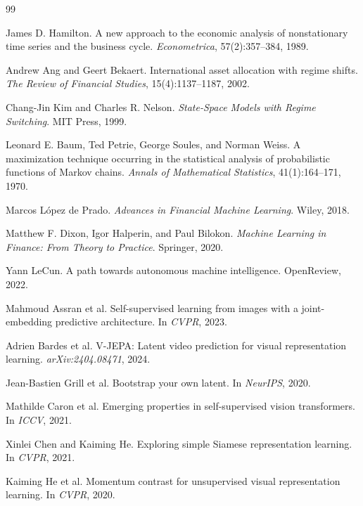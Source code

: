 \documentclass[twocolumn, 10pt]{article}
\begin{document}
\begin{thebibliography}{99}

James D. Hamilton.
\newblock A new approach to the economic analysis of nonstationary time series and the business cycle.
\newblock \emph{Econometrica}, 57(2):357--384, 1989.

Andrew Ang and Geert Bekaert.
\newblock International asset allocation with regime shifts.
\newblock \emph{The Review of Financial Studies}, 15(4):1137--1187, 2002.

Chang-Jin Kim and Charles R. Nelson.
\newblock \emph{State-Space Models with Regime Switching}.
\newblock MIT Press, 1999.

Leonard E. Baum, Ted Petrie, George Soules, and Norman Weiss.
\newblock A maximization technique occurring in the statistical analysis of probabilistic functions of Markov chains.
\newblock \emph{Annals of Mathematical Statistics}, 41(1):164--171, 1970.

Marcos L\'{o}pez de Prado.
\newblock \emph{Advances in Financial Machine Learning}.
\newblock Wiley, 2018.

Matthew F. Dixon, Igor Halperin, and Paul Bilokon.
\newblock \emph{Machine Learning in Finance: From Theory to Practice}.
\newblock Springer, 2020.

Yann LeCun.
\newblock A path towards autonomous machine intelligence.
\newblock OpenReview, 2022.

Mahmoud Assran et al.
\newblock Self-supervised learning from images with a joint-embedding predictive architecture.
\newblock In \emph{CVPR}, 2023.

Adrien Bardes et al.
\newblock V-JEPA: Latent video prediction for visual representation learning.
\newblock \emph{arXiv:2404.08471}, 2024.

Jean-Bastien Grill et al.
\newblock Bootstrap your own latent.
\newblock In \emph{NeurIPS}, 2020.

Mathilde Caron et al.
\newblock Emerging properties in self-supervised vision transformers.
\newblock In \emph{ICCV}, 2021.

Xinlei Chen and Kaiming He.
\newblock Exploring simple Siamese representation learning.
\newblock In \emph{CVPR}, 2021.

Kaiming He et al.
\newblock Momentum contrast for unsupervised visual representation learning.
\newblock In \emph{CVPR}, 2020.


\end{thebibliography}
\end{document}
